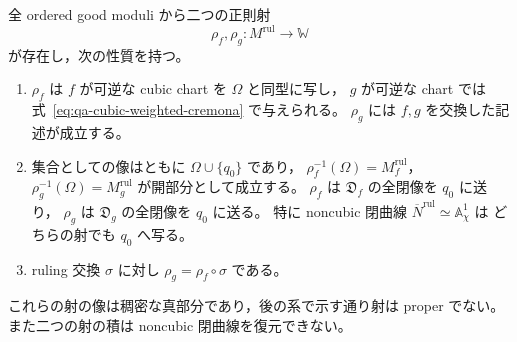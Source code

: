\begin{theorem}[二つの全域OU射]
\label{thm:qa-global-two-ou-morphisms}
全 ordered good moduli から二つの正則射
\[
 \rho_f,\rho_g:M^{\mathrm{rul}}\longrightarrow\mathbb W
\]
が存在し，次の性質を持つ。
\begin{enumerate}
\item $\rho_f$ は $f$ が可逆な cubic chart を $\Omega$ と同型に写し，
      $g$ が可逆な chart では式~\eqref{eq:qa-cubic-weighted-cremona} で与えられる。
      $\rho_g$ には $f,g$ を交換した記述が成立する。
\item 集合としての像はともに $\Omega\cup\{q_0\}$ であり，
      $\rho_f^{-1}(\Omega)=M_f^{\mathrm{rul}}$，
      $\rho_g^{-1}(\Omega)=M_g^{\mathrm{rul}}$ が開部分として成立する。
      $\rho_f$ は $\mathfrak D_f$ の全閉像を $q_0$ に送り，
      $\rho_g$ は $\mathfrak D_g$ の全閉像を $q_0$ に送る。
      特に noncubic 閉曲線 $\overline N^{\mathrm{rul}}\simeq\mathbb A^1_\chi$ は
      どちらの射でも $q_0$ へ写る。
\item ruling 交換 $\sigma$ に対し
      $\rho_g=\rho_f\circ\sigma$ である。
\end{enumerate}
これらの射の像は稠密な真部分であり，後の系で示す通り射は proper でない。
また二つの射の積は noncubic 閉曲線を復元できない。
\end{theorem}
